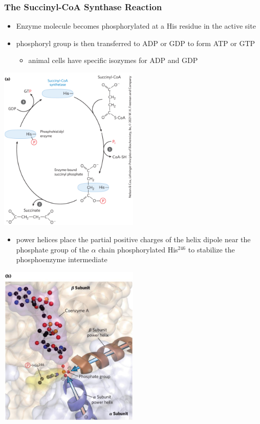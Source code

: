 \documentclass[10pt]{article}
\begin{document}
\subsubsection*{The Succinyl-CoA Synthase Reaction}
\begin{itemize}
	\item Enzyme molecule becomes phosphorylated at a His residue in the active site
	\item phosphoryl group is then transferred to ADP or GDP to form ATP or GTP
	\begin{itemize}
        \item animal cells have specific isozymes for ADP and GDP
    \end{itemize}
\end{itemize}
\begin{center} 
	\includegraphics*[width=0.5\textwidth]{L4_11.png} 
\end{center}
\begin{itemize}
	\item power helices place the partial positive charges of the helix dipole near the phosphate group of the $\alpha$ chain phosphorylated His$^{246}$ to stabilize the phosphoenzyme intermediate
\end{itemize}
\begin{center} 
	\includegraphics*[width=0.5\textwidth]{L4_12.png} 
\end{center}
\end{document}
